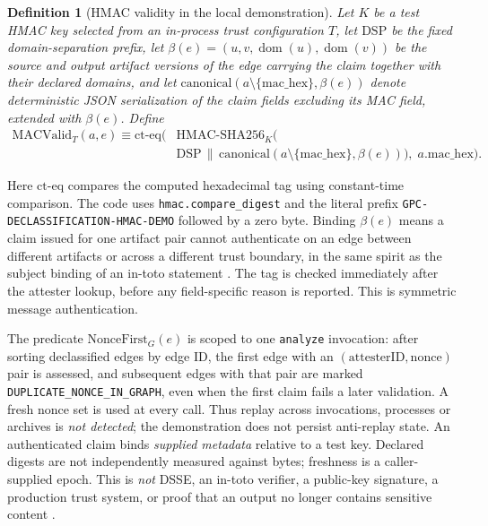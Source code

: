 \documentclass[11pt,letterpaper]{article}
\newtheorem{definition}{Definition}
\newcommand{\code}[1]{\texttt{#1}}
\newcommand{\dom}{\operatorname{dom}}
\begin{document}
\begin{definition}[HMAC validity in the local demonstration]\label{def:mac}
Let \(K\) be a test HMAC key selected from an in-process trust configuration \(T\),
let \(\mathrm{DSP}\) be the fixed domain-separation prefix, let
\(\beta(e)=(u,v,\dom(u),\dom(v))\) be the source and output artifact versions of the edge carrying the claim together with their declared domains, and let
\(\mathrm{canonical}(a\setminus\{\mathrm{mac\_hex}\},\beta(e))\) denote deterministic JSON
serialization of the claim fields \emph{excluding} its MAC field, extended with \(\beta(e)\). Define
\begin{equation}
\begin{aligned}
\mathrm{MACValid}_{T}(a,e)\equiv\mathrm{ct\mbox{-}eq}\big(&\mathrm{HMAC\mbox{-}SHA256}_{K}(\\[-2pt]
&\mathrm{DSP}\,\|\,\mathrm{canonical}(a\setminus\{\mathrm{mac\_hex}\},\beta(e))),\; a.\mathrm{mac\_hex}\big).
\end{aligned}
\label{eq:macvalid}
\end{equation}
\end{definition}
Here \(\mathrm{ct\mbox{-}eq}\) compares the computed hexadecimal tag using
constant-time comparison. The code uses \code{hmac.compare\_digest} and the
literal prefix \code{GPC-DECLASSIFICATION-HMAC-DEMO} followed by a zero byte.
Binding \(\beta(e)\) means a claim issued for one artifact pair cannot authenticate on an edge between different artifacts or across a different trust boundary, in the same spirit as the subject binding of an in-toto statement \cite{intoto}. The tag is checked immediately after the attester lookup, before any field-specific reason is reported. This is symmetric message authentication.

The predicate \(\mathrm{NonceFirst}_G(e)\) is scoped to one \code{analyze} invocation: after sorting declassified edges by edge ID, the first edge with an \((\mathrm{attesterID},\mathrm{nonce})\) pair is assessed, and subsequent edges with that pair are marked \code{DUPLICATE\_NONCE\_IN\_GRAPH}, even when the first claim fails a later validation. A fresh nonce set is used at every call. Thus replay across invocations, processes or archives is \emph{not detected}; the demonstration does not persist anti-replay state. An authenticated claim binds \emph{supplied metadata} relative to a test key. Declared digests are not independently measured against bytes; freshness is a caller-supplied epoch. This is \emph{not} DSSE, an in-toto verifier, a public-key signature, a production trust system, or proof that an output no longer contains sensitive content \cite{intoto,dsse}.
\end{document}
